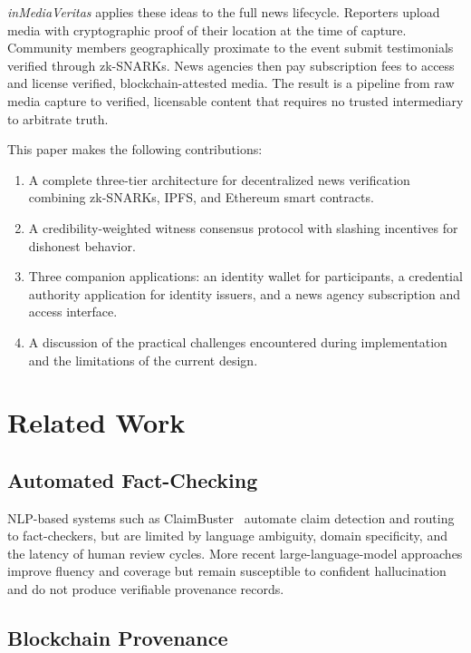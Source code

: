 \documentclass[11pt]{article}
\begin{document}
\textit{inMediaVeritas} applies these ideas to the full news lifecycle.
Reporters upload media with cryptographic proof of their location at the time
of capture. Community members geographically proximate to the event submit
testimonials verified through zk-SNARKs. News agencies then pay subscription
fees to access and license verified, blockchain-attested media. The result is
a pipeline from raw media capture to verified, licensable content that requires
no trusted intermediary to arbitrate truth.

This paper makes the following contributions:
\begin{enumerate}[noitemsep]
  \item A complete three-tier architecture for decentralized news verification
    combining zk-SNARKs, IPFS, and Ethereum smart contracts.
  \item A credibility-weighted witness consensus protocol with slashing
    incentives for dishonest behavior.
  \item Three companion applications: an identity wallet for participants,
    a credential authority application for identity issuers, and a news agency
    subscription and access interface.
  \item A discussion of the practical challenges encountered during
    implementation and the limitations of the current design.
\end{enumerate}

\section{Related Work}

\subsection{Automated Fact-Checking}

NLP-based systems such as ClaimBuster~\cite{hassan2017} automate claim
detection and routing to fact-checkers, but are limited by language ambiguity,
domain specificity, and the latency of human review cycles. More recent
large-language-model approaches improve fluency and coverage but remain
susceptible to confident hallucination and do not produce verifiable provenance
records.

\subsection{Blockchain Provenance}
\end{document}
